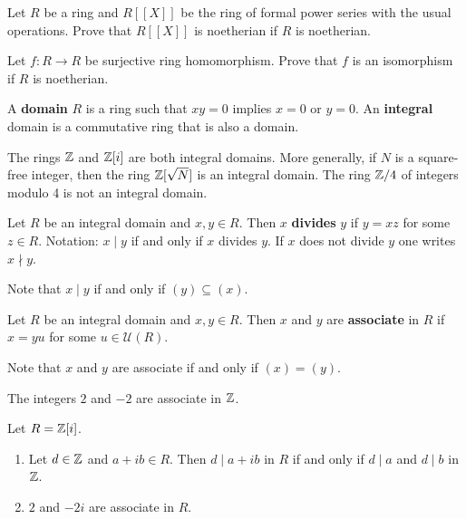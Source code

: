  
\begin{exercise}
    Let $R$ be a ring and $R[\![X]\!]$ be the ring of formal power series with the usual operations.  
	Prove that $R[\![X]\!]$ is noetherian if $R$ is noetherian. 	
\end{exercise}

\begin{exercise}
	Let $f\colon R\to R$ be surjective ring homomorphism. Prove that $f$ is an isomorphism
	if $R$ is noetherian. 	
\end{exercise}


\begin{definition}
    A \textbf{domain} $R$ is a ring such that $xy=0$ implies $x=0$ or $y=0$. 
    An \textbf{integral} domain is a commutative ring that is also a domain. 
\end{definition}

The rings $\mathbb{Z}$ and $\mathbb{Z}[i]$ are both integral domains. 
More generally, if $N$ is a square-free integer, 
then the ring $\mathbb{Z}[\sqrt{N}]$ is an integral domain.  
The ring $\mathbb{Z}/4$ of 
integers modulo 4 is not an integral domain. 

\begin{definition}
	Let $R$ be an integral domain and $x,y\in R$. Then $x$ \textbf{divides} $y$ 
	if $y=xz$ for some $z\in R$. 
	Notation: $x\mid y$ if and only if $x$ divides $y$. If $x$ does not
	divide $y$ one writes $x\nmid y$.  
\end{definition}

Note that $x\mid y$ if and only if $(y)\subseteq (x)$.
	
\begin{definition}
	Let $R$ be an integral domain and $x,y\in R$. Then $x$ and $y$ are
	\textbf{associate} in $R$ if $x=yu$ for some $u\in\mathcal{U}(R)$. 
\end{definition}

Note that $x$ and $y$ are associate if and only if $(x)=(y)$.  

\begin{example}
	The integers $2$ and $-2$ are associate in $\mathbb{Z}$.	
\end{example}

\begin{example}
	Let $R=\mathbb{Z}[i]$. 
	\begin{enumerate}
		\item Let $d\in\mathbb{Z}$ and $a+ib\in R$. Then $d\mid a+ib$ in $R$ if and only if 
			$d\mid a$ and $d\mid b$ in $\mathbb{Z}$. 
		\item $2$ and $-2i$ are associate in $R$.
	\end{enumerate} 	
\end{example}

